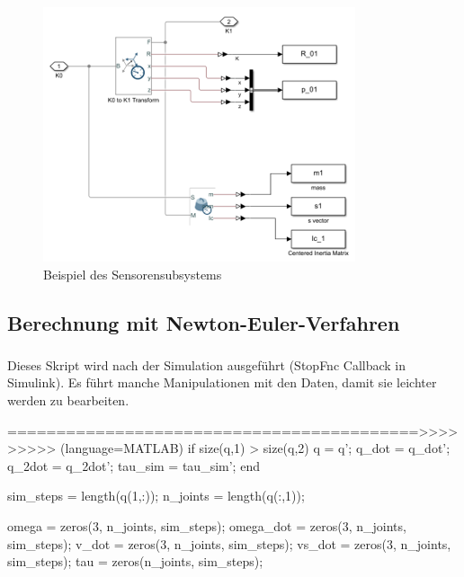 	\begin{figure}[!htbp]
		\centering
		\includegraphics[width=1\linewidth]{grafic/sensor_koordinatensystem}
		\caption{Beispiel des Sensorensubsystems}
		\label{fig:sensoren_subsystem}
	\end{figure}


\subsection{Berechnung mit Newton-Euler-Verfahren}

	\subsubsection{}

	Dieses Skript wird nach der Simulation ausgeführt (StopFnc Callback in Simulink).
	Es führt manche Manipulationen mit den Daten, damit sie leichter werden zu bearbeiten.

==========================================>>>>>>>>> (language=MATLAB)
	if size(q,1) > size(q,2)
		q = q';
		q_dot = q_dot';
		q_2dot = q_2dot';
		tau_sim = tau_sim';
	end

	sim_steps = length(q(1,:));
	n_joints = length(q(:,1));

	omega = zeros(3, n_joints, sim_steps);
	omega_dot = zeros(3, n_joints, sim_steps);
	v_dot = zeros(3, n_joints, sim_steps);
	vs_dot = zeros(3, n_joints, sim_steps);
	tau = zeros(n_joints, sim_steps);

